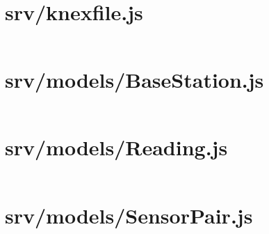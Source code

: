 \section{srv/knexfile.js}
\label{code:srv-knexfile}
\inputminted{javascript}{../srv/knexfile.js}

\section{srv/models/BaseStation.js}
\label{code:srv-basestation-model}
\inputminted{javascript}{../srv/models/BaseStation.js}

\section{srv/models/Reading.js}
\label{code:srv-reading-model}
\inputminted{javascript}{../srv/models/Reading.js}

\section{srv/models/SensorPair.js}
\label{code:srv-sensorpair-model}
\inputminted{javascript}{../srv/models/SensorPair.js}